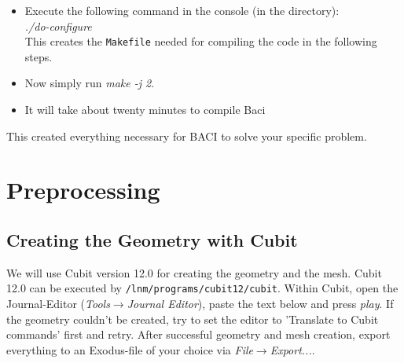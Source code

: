\begin{itemize}
\item Execute the following command in the console (in the \baci{} directory):\\
\emph{./do-configure}\\
This creates the \texttt{Makefile} needed for compiling the code
in the following steps. 
\item Now simply run \emph{make -j 2}.
\item It will take about twenty minutes to compile Baci
\end{itemize}
This created everything necessary for BACI to solve your specific
problem.


\section{Preprocessing}

\subsection{Creating the Geometry with Cubit}
We will use Cubit version 12.0 for creating the geometry and the mesh. Cubit 12.0 can be executed by \newline
\texttt{/lnm/programs/cubit12/cubit}. Within Cubit, open the Journal-Editor (\emph{Tools}$\to$\emph{Journal
Editor}), paste the text below and press \emph{play}. If the geometry couldn't be created, try to set the editor to 
'Translate to Cubit commands' first and retry. After successful geometry and mesh creation, export everything to an Exodus-file of your choice via \emph{File}$\to$\emph{Export...}.

